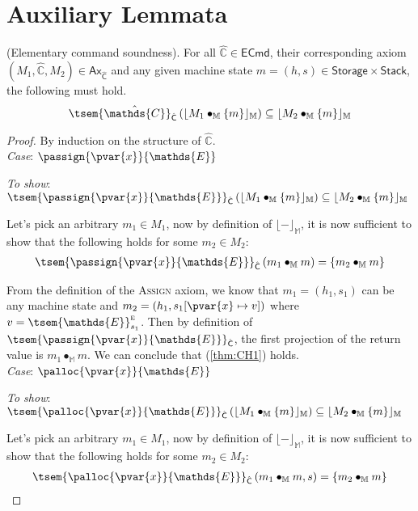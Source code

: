 \section{Auxiliary Lemmata}

\thm \label{thm:eSound} (Elementary command soundness). For all $\hat{\mathds{C}} \in \mathsf{ECmd}$, their corresponding axiom $(M_1, \hat{\mathds{C}}, M_2) \in \mathsf{Ax}_{\hat{\mathsf{C}}}$ and any given machine state $m = (h, s) \in \mathsf{Storage} \times \mathsf{Stack}$, the following must hold.
\[
	\tsem{\hat{\mathds{C}}}_{\hat{\mathsf{C}}} \left( \lfloor M_1 \bullet_\mathbb{M} \{m\} \rfloor_\mathbb{M} \right) \subseteq \lfloor M_2 \bullet_\mathbb{M} \{m\} \rfloor_\mathbb{M}
\]
{\parindent0pt
\begin{proof}
By induction on the structure of $\hat{\mathds{C}}$. \\

\textit{Case}: $\passign{\pvar{x}}{\mathds{E}}$

\textit{To show}: $\tsem{\passign{\pvar{x}}{\mathds{E}}}_{\hat{\mathsf{C}}} \left( \lfloor M_1 \bullet_\mathbb{M} \{m\} \rfloor_\mathbb{M} \right) \subseteq \lfloor M_2 \bullet_\mathbb{M} \{m\} \rfloor_\mathbb{M}$

Let's pick an arbitrary $m_1 \in M_1$, now by definition of $\lfloor - \rfloor_\mathbb{M}$, it is now sufficient to show that the following holds for some $m_2 \in M_2$:
\begin{gather}
	\label{thm:CH1} \tsem{\passign{\pvar{x}}{\mathds{E}}}_{\hat{\mathsf{C}}} \left(m_1 \bullet_\mathbb{M} m \right) = \{ m_2 \bullet_\mathbb{M} m \}
\end{gather}

From the definition of the \textsc{Assign} axiom, we know that $m_1 = (h_1, s_1)$ can be any machine state and $m_2 = (h_1, s_1[\pvar{x} \mapsto v])$ where $v = \tsem{\mathds{E}}^\textsc{e}_{s_1}$. Then by definition of $\tsem{\passign{\pvar{x}}{\mathds{E}}}_{\hat{\mathsf{C}}}$, the first projection of the return value is $m_1 \bullet_\mathbb{M} m$. We can conclude that (\ref{thm:CH1}) holds.  \\

\textit{Case}: $\palloc{\pvar{x}}{\mathds{E}}$

\textit{To show}: $\tsem{\palloc{\pvar{x}}{\mathds{E}}}_{\hat{\mathsf{C}}} \left( \lfloor M_1 \bullet_\mathbb{M} \{m\} \rfloor_\mathbb{M} \right) \subseteq \lfloor M_2 \bullet_\mathbb{M} \{m\} \rfloor_\mathbb{M}$

Let's pick an arbitrary $m_1 \in M_1$, now by definition of $\lfloor - \rfloor_\mathbb{M}$, it is now sufficient to show that the following holds for some $m_2 \in M_2$:
\begin{gather}
	\label{thm:CH3} \tsem{\palloc{\pvar{x}}{\mathds{E}}}_{\hat{\mathsf{C}}} \left(m_1 \bullet_\mathbb{M} m, s \right) = \{ m_2 \bullet_\mathbb{M} m \}
\end{gather}


\end{proof}}

